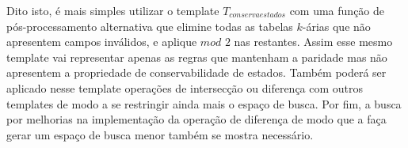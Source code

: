 Dito isto, é mais simples utilizar o template $T_{conservaestados}$ com uma função de pós-processamento alternativa que elimine todas as tabelas $k$-árias que não apresentem campos inválidos, e aplique $mod$ $2$ nas restantes. Assim  esse mesmo template vai representar apenas as regras que mantenham a paridade mas não apresentem a propriedade de conservabilidade de estados. Também poderá ser aplicado nesse template operações de intersecção ou diferença com outros templates de modo a se restringir ainda mais o espaço de busca. Por fim, a busca por melhorias na implementação da operação de diferença de modo que a faça gerar um espaço de busca menor também se mostra necessário.